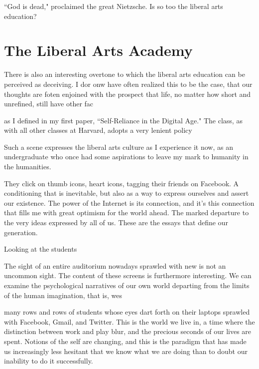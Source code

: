 \documentclass[12pt,letterpaper]{article}
\newif\ifdraft
\begin{document}
\ifdraft
And I too was one of them, and there I looked, just couldn't help but noticing a certain look in Puett's face that can best be described as pity.
\fi

``God is dead," proclaimed the great Nietzsche.  Is so too the liberal arts education?

\section{The Liberal Arts Academy}



There is also an interesting overtone to which the liberal arts education can be perceived as deceiving.  I dor onw have often realized this to be the case, that our thoughts are foten enjoined with the prospect that life, no matter how short and unrefined, still  have other fac

as I defined in my first paper, ``Self-Reliance in the Digital Age."  The class, as with all other classes at Harvard, adopts a very lenient policy

Such a scene expresses the liberal arts culture as I experience it now, as an undergraduate who once had some aspirations to leave my mark to humanity in the humanities.   



They click on thumb icons, heart icons, tagging their friends on Facebook.  A conditioning that is inevitable, but also as a way to express ourselves and assert our existence.  The power of the Internet is its connection, and it's this connection that fills me with great optimism for the world ahead.  The marked departure to the very ideas expressed by all of us.  These are the essays that define our generation.

Looking at the students 

The sight of an entire auditorium nowadays sprawled with new is not an uncommon sight.  The content of these screens is furthermore interesting.  We can examine the psychological narratives of our own world departing from the limits of the human imagination, that is, wes

 many rows and rows of students whose eyes dart forth on their laptops sprawled with Facebook, Gmail, and Twitter.  This is the world we live in, a time where the distinction between work and play blur, and the precious seconds of our lives are spent.  Notions of the self are changing, and this is the paradigm that has made us increasingly less hesitant that we know what we are doing than to doubt our inability to do it successfully.
\end{document}

